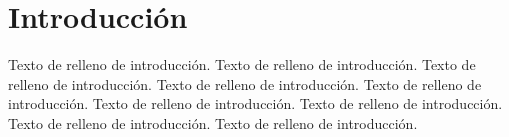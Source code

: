 \documentclass{article}
\begin{document}
	
	\maketitle
	
	\section{Introducción}
	
	Texto de relleno de introducción.
	Texto de relleno de introducción.
	Texto de relleno de introducción.
	Texto de relleno de introducción.
	Texto de relleno de introducción.
	Texto de relleno de introducción.
	Texto de relleno de introducción.
	Texto de relleno de introducción.
	Texto de relleno de introducción.
	
\end{document}
